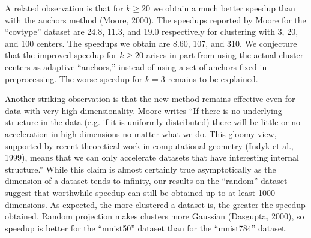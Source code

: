 A related observation is that for \( k \ge 20 \) we obtain a much better speedup than with the anchors method (Moore, 2000). The speedups reported by Moore for the ``covtype'' dataset are 24.8, 11.3, and 19.0 respectively for clustering with 3, 20, and 100 centers. The speedups we obtain are 8.60, 107, and 310. We conjecture that the improved speedup for \( k \ge 20 \) arises in part from using the actual cluster centers as adaptive ``anchors,'' instead of using a set of anchors fixed in preprocessing. The worse speedup for \( k = 3 \) remains to be explained.

Another striking observation is that the new method remains effective even for data with very high dimensionality. Moore writes ``If there is no underlying structure in the data (e.g. if it is uniformly distributed) there will be little or no acceleration in high dimensions no matter what we do. This gloomy view, supported by recent theoretical work in computational geometry (Indyk et al., 1999), means that we can only accelerate datasets that have interesting internal structure.'' While this claim is almost certainly true asymptotically as the dimension of a dataset tends to infinity, our results on the ``random'' dataset suggest that worthwhile speedup can still be obtained up to at least 1000 dimensions. As expected, the more clustered a dataset is, the greater the speedup obtained. Random projection makes clusters more Gaussian (Dasgupta, 2000), so speedup is better for the ``mnist50'' dataset than for the ``mnist784'' dataset.

